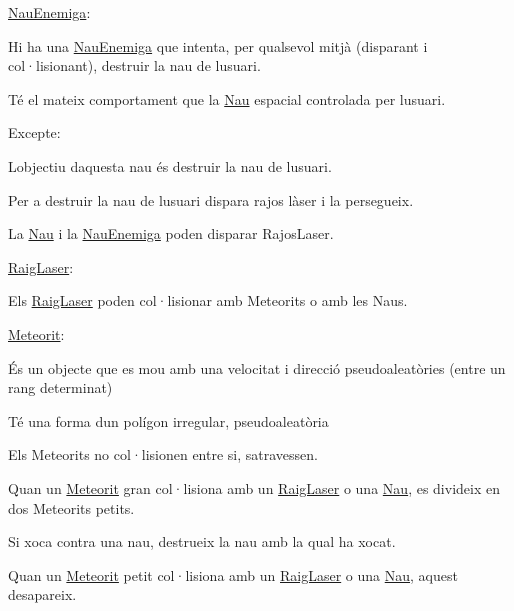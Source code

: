 \hyperlink{class_nau_enemiga}{Nau\+Enemiga}\+:
\begin{DoxyItemize}
\item Hi ha una \hyperlink{class_nau_enemiga}{Nau\+Enemiga} que intenta, per qualsevol mitjà (disparant i col·lisionant), destruir la nau de l\textquotesingle{}usuari.
\item Té el mateix comportament que la \hyperlink{class_nau}{Nau} espacial controlada per l\textquotesingle{}usuari.
\item Excepte\+:
\begin{DoxyItemize}
\item L\textquotesingle{}objectiu d\textquotesingle{}aquesta nau és destruir la nau de l\textquotesingle{}usuari.
\item Per a destruir la nau de l\textquotesingle{}usuari dispara rajos làser i la persegueix.
\end{DoxyItemize}
\item La \hyperlink{class_nau}{Nau} i la \hyperlink{class_nau_enemiga}{Nau\+Enemiga} poden disparar Rajos\+Laser.
\end{DoxyItemize}

\hyperlink{class_raig_laser}{Raig\+Laser}\+:
\begin{DoxyItemize}
\item Els \hyperlink{class_raig_laser}{Raig\+Laser} poden col·lisionar amb Meteorits o amb les Naus.
\end{DoxyItemize}

\hyperlink{class_meteorit}{Meteorit}\+:
\begin{DoxyItemize}
\item És un objecte que es mou amb una velocitat i direcció pseudoaleatòries (entre un rang determinat)
\item Té una forma d\textquotesingle{}un polígon irregular, pseudoaleatòria
\item Els Meteorits no col·lisionen entre si, s\textquotesingle{}atravessen.
\item Quan un \hyperlink{class_meteorit}{Meteorit} gran col·lisiona amb un \hyperlink{class_raig_laser}{Raig\+Laser} o una \hyperlink{class_nau}{Nau}, es divideix en dos Meteorits petits.
\item Si xoca contra una nau, destrueix la nau amb la qual ha xocat.
\item Quan un \hyperlink{class_meteorit}{Meteorit} petit col·lisiona amb un \hyperlink{class_raig_laser}{Raig\+Laser} o una \hyperlink{class_nau}{Nau}, aquest desapareix.
\end{DoxyItemize}

